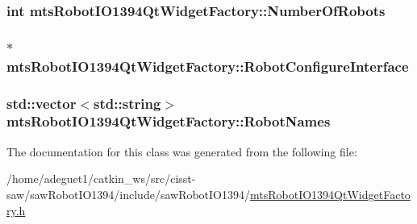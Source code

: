 \hypertarget{classmts_robot_i_o1394_qt_widget_factory_a12d58bb02a5e646dc4d901430db1753c}{
\subsubsection[{Number\-Of\-Robots}]{\setlength{\rightskip}{0pt plus 5cm}int mts\-Robot\-I\-O1394\-Qt\-Widget\-Factory\-::\-Number\-Of\-Robots\hspace{0.3cm}{\ttfamily [protected]}}}\label{classmts_robot_i_o1394_qt_widget_factory_a12d58bb02a5e646dc4d901430db1753c}
\hypertarget{classmts_robot_i_o1394_qt_widget_factory_a5456e298db56b3eb79c89bbbedd21846}{
\subsubsection[{Robot\-Configure\-Interface}]{$\ast$ mts\-Robot\-I\-O1394\-Qt\-Widget\-Factory\-::\-Robot\-Configure\-Interface\hspace{0.3cm}{\ttfamily [protected]}}}\label{classmts_robot_i_o1394_qt_widget_factory_a5456e298db56b3eb79c89bbbedd21846}
\hypertarget{classmts_robot_i_o1394_qt_widget_factory_ad869dbe413a4475f430975043773b5e9}{
\subsubsection[{Robot\-Names}]{\setlength{\rightskip}{0pt plus 5cm}std\-::vector$<$std\-::string$>$ mts\-Robot\-I\-O1394\-Qt\-Widget\-Factory\-::\-Robot\-Names\hspace{0.3cm}{\ttfamily [protected]}}}\label{classmts_robot_i_o1394_qt_widget_factory_ad869dbe413a4475f430975043773b5e9}


The documentation for this class was generated from the following file\-:\begin{DoxyCompactItemize}
\item 
/home/adeguet1/catkin\-\_\-ws/src/cisst-\/saw/saw\-Robot\-I\-O1394/include/saw\-Robot\-I\-O1394/\hyperlink{mts_robot_i_o1394_qt_widget_factory_8h}{mts\-Robot\-I\-O1394\-Qt\-Widget\-Factory.\-h}\end{DoxyCompactItemize}
